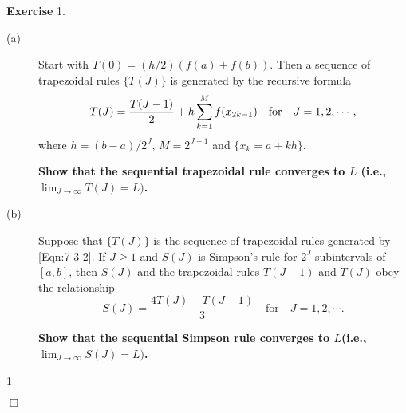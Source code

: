 \documentclass[UTF8,12pt,hyperref]{ctexart}
\makeatletter
\newenvironment{exercise}[1][{\color{blue}\bf Exercise}]%
{%
 \begin{center}   \begin{lrbox}{\@tempboxa}%
    \begin{minipage}{\textwidth}%
  {\color{blue}\bfseries
#1}   }{%
    \end{minipage}%
    \end{lrbox}
    \colorbox{green}{\noindent\usebox{\@tempboxa}} \end{center}  
}
\newenvironment{solve}[1][\color{blue}\bf Solve]{\begin{trivlist}
\item[\hskip \labelsep {\color{blue}\bfseries
#1}]}{\hfill$\Box$\end{trivlist}}
\makeatother
\begin{document}
  
\begin{exercise}1.    \quad %
\begin{description}
\item[(a)] Start with $T(0)=(h/2)(f(a) + f(b))$. Then a sequence of trapezoidal rules $\{T(J)\}$ is generated by the recursive formula  \vspace{-0.18cm} 
\begin{equation}\label{Eqn:7-3-2}
T(J)=\dfrac{T(J-1)}{2}+h\sum\limits_{k=1}^Mf(x_{2k-1}) \quad\text{for}\quad J=1, 2, \cdots ,   \vspace{-0.18cm}  
\end{equation}
where $h= (b- a)/2^J$, {$M=2^{J-1}$ } and $\{x_k=a+kh\}$. 

{\bf Show that the sequential trapezoidal rule converges to $L$ (i.e., $\lim_{J\to \infty}T(J) = L)$. }


\item[(b)] Suppose that $\{T(J)\}$ is the sequence of trapezoidal rules generated by \eqref{Eqn:7-3-2}. If $J\geqslant 1$ and $S(J)$ is Simpson's rule for $2^J$ subintervals of $[a, b]$, then $S(J)$ and the trapezoidal rules $T(J -1)$ and $T(J)$ obey the relationship  \vspace{-0.18cm}  
\begin{equation}\label{Eqn:7-3-7}
S(J)=\dfrac{4T(J)-T(J-1)}{3} \quad\text{for}\quad J=1, 2, \cdots . 
\end{equation}


 {\bf  Show that the sequential Simpson rule converges to $L$(i.e., $\lim_{J\to \infty}S(J) = L)$. }
 
 \end{description}  
  \end{exercise} 
  
 
\begin{solve}
  1

\end{solve}
\end{document}
